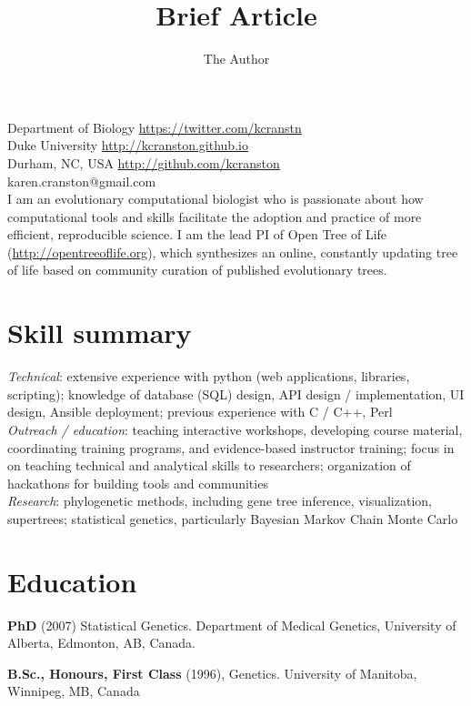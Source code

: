 \documentclass[10pt]{article}
\title{Brief Article}
\author{The Author}
\begin{document}
\noindent Department of Biology \hfill \url{https://twitter.com/kcranstn} \\
Duke University  \hfill \url{http://kcranston.github.io} \\
Durham, NC, USA \hfill  \url{http://github.com/kcranston} \\
karen.cranston@gmail.com  \\

\vspace{0.4cm}
I am an evolutionary computational biologist who is passionate about how computational tools and skills facilitate the adoption and practice of more efficient, reproducible science. I am the lead PI of Open Tree of Life (\url{http://opentreeoflife.org}), which synthesizes an online, constantly updating tree of life based on community curation of published evolutionary trees. 

\section*{Skill summary}

\emph{Technical}: extensive experience with python (web applications, libraries, scripting); knowledge of database (SQL) design, API design / implementation, UI design, Ansible deployment; previous experience with C / C++, Perl \\

\emph{Outreach / education}: teaching interactive workshops, developing course material, coordinating training programs, and evidence-based instructor training; focus in on teaching technical and analytical skills to researchers; organization of hackathons for building tools and communities \\ 

\emph{Research}: phylogenetic methods, including gene tree inference, visualization, supertrees; statistical genetics, particularly Bayesian Markov Chain Monte Carlo \\

\section*{Education}
{\bf PhD} (2007) Statistical Genetics. Department of Medical Genetics, University of Alberta, Edmonton, AB, Canada. 

{\bf B.Sc., Honours, First Class} (1996), Genetics. University of Manitoba, Winnipeg, MB, Canada \\

\end{document}
